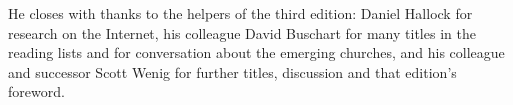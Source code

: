 He closes with thanks to the helpers of the third edition: Daniel Hallock for research on the Internet,
his colleague David Buschart for many titles in the reading lists and for conversation about the
emerging churches, and his colleague and successor Scott Wenig for further titles, discussion and that
edition's foreword.
